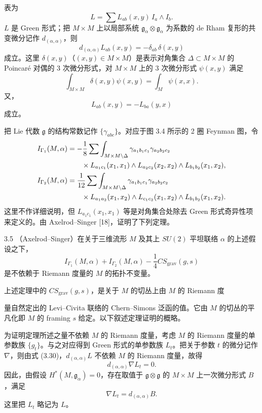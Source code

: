 表为
\[
  L=\sum L_{ab}(x,y)\,I_a\wedge I_b .
\]
$L$ 是 Green 形式；把 $M\times M$ 上以局部系统 $\mathfrak{g}_\alpha\otimes\mathfrak{g}_\alpha$ 为系数的 de Rham 复形的共变微分记作 $d_{(\alpha,\alpha)}$，则
\begin{equation}
  d_{(\alpha,\alpha)}L_{ab}(x,y)=-\delta_{ab}\,\delta(x,y) \tag{3.30}
\end{equation}
成立。这里 $\delta(x,y)$（$(x,y)\in M\times M$）是表示对角集合 $\Delta\subset M\times M$ 的 Poincaré 对偶的 3 次微分形式，对 $M\times M$ 上的 3 次微分形式 $\psi(x,y)$ 满足
\[
  \int_{M\times M}\delta(x,y)\psi(x,y)=\int_{M}\psi(x,x).
\]
又，
\[
  L_{ab}(x,y)=-L_{ba}(y,x)
\]
成立。

把 Lie 代数 $\mathfrak{g}$ 的结构常数记作 $\{\gamma_{abc}\}$。对应于图 3.4 所示的 2 圈 Feynman 图，令
\begin{align*}
  I_{\Gamma_1}(M,\alpha)
  &=-\frac{1}{8}\sum\int_{M\times M\setminus\Delta}
  \gamma_{a_1b_1c_1}\gamma_{a_2b_2c_2}\notag\\
  &\qquad\times L_{a_1c_1}(x_1,x_1)\wedge L_{a_2c_2}(x_2,x_2)\wedge L_{b_1b_2}(x_1,x_2),\\
  I_{\Gamma_2}(M,\alpha)
  &=\frac{1}{12}\sum\int_{M\times M\setminus\Delta}
  \gamma_{a_1b_1c_1}\gamma_{a_2b_2c_2}\notag\\
  &\qquad\times L_{a_1a_2}(x_1,x_2)\wedge L_{c_1c_2}(x_1,x_2)\wedge L_{b_1b_2}(x_1,x_2).
\end{align*}
这里不作详细说明，但 $L_{a_1c_1}(x_1,x_1)$ 等是对角集合处除去 Green 形式奇异性项来定义的。由 Axelrod--Singer [18]，证明了下列定理。

\begin{theorem}{3.5}
  （Axelrod--Singer）在关于三维流形 $M$ 及其上 $SU(2)$ 平坦联络 $\alpha$ 的上述假设之下，
  \[
    I_{\Gamma_1}(M,\alpha)+I_{\Gamma_2}(M,\alpha)-\frac{1}{4}CS_{\mathrm{grav}}(g,s)
  \]
  是不依赖于 Riemann 度量的 $M$ 的拓扑不变量。
\end{theorem}

上述定理中的 $CS_{\mathrm{grav}}(g,s)$，是关于 $M$ 的切丛上由 $M$ 的 Riemann 度

量自然定出的 Levi--Civita 联络的 Chern--Simons 泛函的值。它由 $M$ 的切丛的平凡化即 $M$ 的 framing $s$ 给定。以下叙述定理证明的概略。

为证明定理所述之量不依赖 $M$ 的 Riemann 度量，考虑 $M$ 的 Riemann 度量的单参数族 $\{g_t\}$。与之对应得到 Green 形式的单参数族 $L_t$。把关于参数 $t$ 的微分记作 $\nabla$，则由式 (3.30)，$d_{(\alpha,\alpha)}L$ 不依赖 $M$ 的 Riemann 度量，故得
\[
  d_{(\alpha,\alpha)}\nabla L_t=0 .
\]
因此，由假设 $H^{*}(M,\mathfrak{g}_\alpha)=0$，存在取值于 $\mathfrak{g}\otimes\mathfrak{g}$ 的 $M\times M$ 上一次微分形式 $B$，满足
\begin{equation}
  \nabla L_t=d_{(\alpha,\alpha)}B . \tag{3.31}
\end{equation}
这里把 $L_t$ 略记为 $L$。

